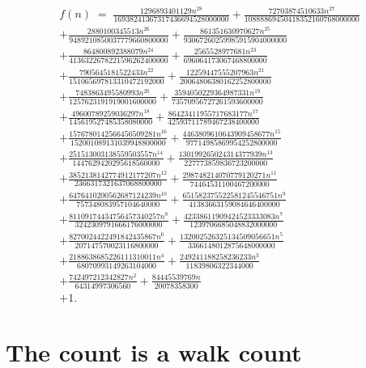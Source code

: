\documentclass[11pt,a4paper]{article}
\theoremstyle{plain}
\theoremstyle{definition}
\begin{document}
\begin{multline*}
f(n)\;=\;\frac{1296893401129 n^{28}}{16938241367317436694528000000} + \frac{72703874510633 n^{27}}{10888869450418352160768000000} \\
+ \frac{2880100345513 n^{26}}{9489210850037779660800000} + \frac{861351630970627 n^{25}}{93067260259985915904000000} \\
+ \frac{864800892388079 n^{24}}{4136322678221596262400000} + \frac{2565528977681 n^{23}}{696064173067468800000} \\
+ \frac{7905645181522433 n^{22}}{151065697813310472192000} + \frac{12259447555207963 n^{21}}{20064806380162252800000} \\
+ \frac{7483863495580993 n^{20}}{1257623191919001600000} + \frac{3594050229364987331 n^{19}}{73570956727261593600000} \\
+ \frac{49600789259036297 n^{18}}{145619527485358080000} + \frac{86423411955717683177 n^{17}}{42593711789467238400000} \\
+ \frac{1576780142566456509281 n^{16}}{152001089131039948800000} + \frac{4463809610643909458677 n^{15}}{97714985869954252800000} \\
+ \frac{251513003138559503557 n^{14}}{1447629420295618560000} + \frac{130199265024314377939 n^{13}}{227773859836723200000} \\
+ \frac{3852138142774912177207 n^{12}}{2366317321637068800000} + \frac{298748214070779120271 n^{11}}{74464531100467200000} \\
+ \frac{6476410200562687124239 n^{10}}{757348083957104640000} + \frac{651582375522581245546751 n^{9}}{41383663159084646400000} \\
+ \frac{81109174434756457340257 n^{8}}{3242309791666176000000} + \frac{42338611909424523333083 n^{7}}{1239706685048832000000} \\
+ \frac{8270024422491842435867 n^{6}}{207147570023116800000} + \frac{132002526325134509056651 n^{5}}{3366148012875648000000} \\
+ \frac{2188638685226111310011 n^{4}}{68070993149263104000} + \frac{249241188258236233 n^{3}}{11839806322344000} \\
+ \frac{742497212342827 n^{2}}{64314997306560} + \frac{84445539769 n}{20078358300} \\
+ 1.
\end{multline*}

\section{The count is a walk count}
\end{document}
